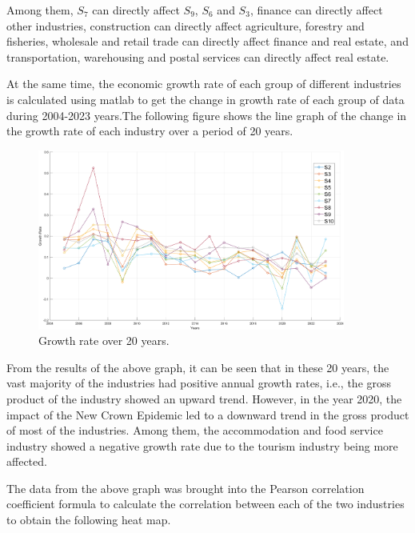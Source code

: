 \documentclass[12pt]{article}  %
\begin{document}
	Among them, $S_7$ can directly affect $S_9$, $S_6$ and $S_3$, finance can directly affect other industries, construction can directly affect agriculture, forestry and fisheries, wholesale and retail trade can directly affect finance and real estate, and transportation, warehousing and postal services can directly affect real estate.
	
	At the same time, the economic growth rate of each group of different industries is calculated using matlab to get the change in growth rate of each group of data during 2004-2023 years.The following figure shows the line graph of the change in the growth rate of each industry over a period of 20 years.
	
	\begin{figure}[H]
		\centering
		\includegraphics[width=0.9\textwidth]{img/q1_Line_20}
		\caption{Growth rate over 20 years.}
		\label{figure3}
	\end{figure}

	From the results of the above graph, it can be seen that in these 20 years, the vast majority of the industries had positive annual growth rates, i.e., the gross product of the industry showed an upward trend. However, in the year 2020, the impact of the New Crown Epidemic led to a downward trend in the gross product of most of the industries. Among them, the accommodation and food service industry showed a negative growth rate due to the tourism industry being more affected.
	
	The data from the above graph was brought into the Pearson correlation coefficient formula to calculate the correlation between each of the two industries to obtain the following heat map.
	
\end{document}
